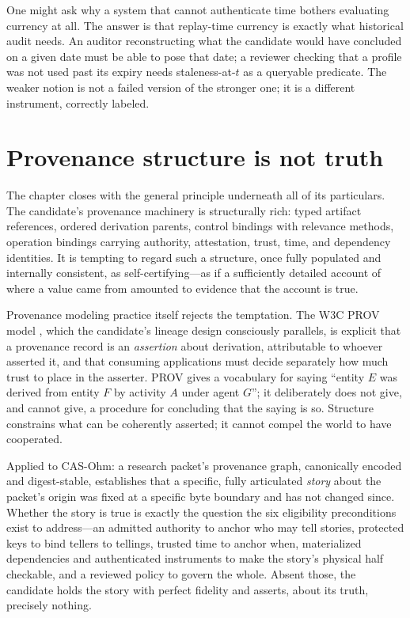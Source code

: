\begin{remark}\label{elig:rem:whyreplay}
One might ask why a system that cannot authenticate time bothers evaluating currency at all. The answer is that replay-time currency is exactly what historical audit needs. An auditor reconstructing what the candidate would have concluded on a given date must be able to pose that date; a reviewer checking that a profile was not used past its expiry needs staleness-at-$t$ as a queryable predicate. The weaker notion is not a failed version of the stronger one; it is a different instrument, correctly labeled.
\end{remark}

\section{Provenance structure is not truth}\label{elig:sec:provnotruth}

The chapter closes with the general principle underneath all of its particulars. The candidate's provenance machinery is structurally rich: typed artifact references, ordered derivation parents, control bindings with relevance methods, operation bindings carrying authority, attestation, trust, time, and dependency identities. It is tempting to regard such a structure, once fully populated and internally consistent, as self-certifying---as if a sufficiently detailed account of where a value came from amounted to evidence that the account is true.

Provenance modeling practice itself rejects the temptation. The W3C PROV model \cite{prov}, which the candidate's lineage design consciously parallels, is explicit that a provenance record is an \emph{assertion} about derivation, attributable to whoever asserted it, and that consuming applications must decide separately how much trust to place in the asserter. PROV gives a vocabulary for saying ``entity $E$ was derived from entity $F$ by activity $A$ under agent $G$''; it deliberately does not give, and cannot give, a procedure for concluding that the saying is so. Structure constrains what can be coherently asserted; it cannot compel the world to have cooperated.

Applied to CAS-Ohm: a research packet's provenance graph, canonically encoded and digest-stable, establishes that a specific, fully articulated \emph{story} about the packet's origin was fixed at a specific byte boundary and has not changed since. Whether the story is true is exactly the question the six eligibility preconditions exist to address---an admitted authority to anchor who may tell stories, protected keys to bind tellers to tellings, trusted time to anchor when, materialized dependencies and authenticated instruments to make the story's physical half checkable, and a reviewed policy to govern the whole. Absent those, the candidate holds the story with perfect fidelity and asserts, about its truth, precisely nothing.


